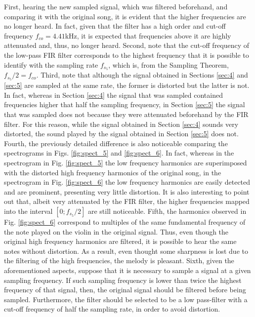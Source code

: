 \documentclass[]{scrartcl}
\begin{document}
First, hearing the new sampled signal, which was filtered beforehand, and comparing it with the original song, it is evident that the higher frequencies are no longer heard. In fact, given that the filter has a high order and cut-off frequency $f_{co} = 4.41$kHz, it is expected that frequencies above it are highly attenuated and, thus, no longer heard. Second, note that the cut-off frequency of the low-pass FIR filter corresponds to the highest frequency that it is possible to identify with the sampling rate $f_{s_5}$, which is, from the Sampling Theorem, $f_{s_5}/2 = f_{co}$. Third, note that although the signal obtained in Sections \ref{sec:4} and \ref{sec:5} are sampled at the same rate, the former is distorted but the latter is not. In fact, whereas in Section \ref{sec:4} the signal that was sampled contained frequencies higher that half the sampling frequency, in Section \ref{sec:5} the signal that was sampled does not because they were attenuated beforehand by the FIR filter. For this reason, while the signal obtained in Section \ref{sec:4} sounds very distorted, the sound played by the signal obtained in Section \ref{sec:5} does not. Fourth, the previously detailed difference is also noticeable comparing the spectrograms in Figs. \ref{fig:spect_5} and \ref{fig:spect_6}. In fact, whereas in the spectrogram in Fig. \ref{fig:spect_5} the low frequency harmonics are superimposed with the distorted high frequency harmonics of the original song, in the spectrogram in Fig. \ref{fig:spect_6} the low frequency harmonics are easily detected and are prominent, presenting very little distortion. It is also interesting to point out that, albeit very attenuated by the FIR filter, the higher frequencies mapped into the interval $[0; f_{s_5}/2]$ are still noticeable. Fifth, the harmonics observed in Fig. \ref{fig:spect_6} correspond to multiples of the same fundamental frequency of the note played on the violin in the original signal. Thus, even though the original high frequency harmonics are filtered, it is possible to hear the same notes without distortion. As a result, even thought some sharpness is lost due to the filtering of the high frequencies, the melody is pleasant. Sixth, given the aforementioned aspects, suppose that it is necessary to sample a signal at a given sampling frequency. If such sampling frequency is lower than twice the highest frequency of that signal,  then, the original signal should be filtered before being sampled. Furthermore, the filter should be selected to be a low pass-filter with a cut-off frequency of half the sampling rate, in order to avoid distortion. 
\end{document}
